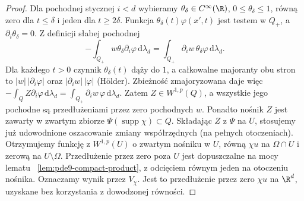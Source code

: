 \begin{proof}
Dla pochodnej stycznej $i<d$ wybieramy
$\theta_\delta\in C^\infty(\R)$, $0\le\theta_\delta\le1$,
równą zero dla $t\le\delta$ i jeden dla $t\ge2\delta$.
Funkcja $\theta_\delta(t)\varphi(x',t)$ jest testem
w $Q_+$, a $\partial_i\theta_\delta=0$. Z definicji
słabej pochodnej
\[
 -\int_{Q_+}w\theta_\delta\partial_i\varphi\,\mathrm d\lambda_d
 =\int_{Q_+}\partial_iw\,\theta_\delta\varphi\,\mathrm d\lambda_d.
\]
Dla każdego $t>0$ czynnik $\theta_\delta(t)$ dąży
do $1$, a całkowalne majoranty obu stron to
$|w|\,|\partial_i\varphi|$ oraz
$|\partial_iw|\,|\varphi|$ (Hölder).
Zbieżność zmajoryzowana daje więc
$-\int_Q Z\partial_i\varphi\,\mathrm d\lambda_d
=\int_{Q_+}\partial_iw\,\varphi\,\mathrm d\lambda_d$.
Zatem $Z\in W^{1,p}(Q)$, a wszystkie jego pochodne
są przedłużeniami przez zero pochodnych $w$.
Ponadto nośnik $Z$ jest zawarty w zwartym zbiorze
$\Psi(\operatorname{supp}\chi)\subset Q$.
Składając $Z$ z $\Psi$ na $U$, stosujemy już udowodnione
oszacowanie zmiany współrzędnych (na pełnych otoczeniach).
Otrzymujemy funkcję z $W^{1,p}(U)$ o zwartym nośniku
w $U$, równą $\chi u$ na $\Omega\cap U$ i zerową
na $U\setminus\Omega$. Przedłużenie przez zero poza $U$
jest dopuszczalne na mocy lematu
~\ref{lem:pde9-compact-product}, z odcięciem równym jeden
na otoczeniu nośnika. Oznaczamy wynik przez $V_\chi$.
Jest to przedłużenie przez zero $\chi u$ na $\R^d$,
uzyskane bez korzystania z dowodzonej równości.


\end{proof}
